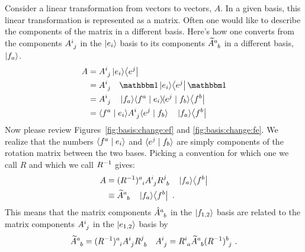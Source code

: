 \documentclass[12pt, oneside]{report}    %
\begin{document}
\begin{subappendices}
Consider a linear transformation from vectors to vectors, $A$. In a given basis, this linear transformation is represented as a matrix. Often one would like to describe the components of the matrix in a different basis. Here's how one converts from the components $A\aij{i}{j}$ in the $\left|e_{i}\right\rangle$ basis to its components $\tilde A\aij{a}{b}$ in a different basis, $\left|f_a\right\rangle$.
\begin{align}
    A &= A\aij{i}{j}\ket{e_i}\!\bra{e^j}
    \\&=
    A\aij{i}{j}\quad
    \one
    \ket{e_i}\!\bra{e^j}
    \one
    \\&=
    A\aij{i}{j}\quad
    \ket{f_a}\!\la {f^a} \mid 
     {e_i} \ra\!  \la {e^j} \mid
    {f_b}\ra \!\bra{f^b}
    \\&=
    \la {f^a} \mid 
     {e_i} \ra
    A\aij{i}{j}
    \la {e^j} \mid
    {f_b}\ra
    \quad
    \ket{f_a}\!\bra{f^b}
\end{align}
Now please review Figures~\ref{fig:basis:change:ef} and \ref{fig:basis:change:fe}. We realize that the numbers $\langle {f^a} \mid 
     {e_i} \rangle$ and $\langle {e^j} \mid
    {f_b}\rangle$ are simply components of the rotation matrix between the two bases. Picking a convention for which one we call $R$ and which we call $R^{-1}$ gives:
\begin{align}
    A &= (R\inv)\aij{a}{i}
    A\aij{i}{j}
    R\aij{j}{b}
    \quad
    \ket{f_a}\!\bra{f^b} 
    \\&\equiv
    \tilde A\aij{a}{b}
    \quad
    \ket{f_a}\!\bra{f^b}
    \ .
\end{align}
This means that the matrix components $\hat A\aij{a}{b}$ in the $\left|f_{1,2}\right\rangle$ basis are related to the matrix components $A\aij{i}{j}$ in the $\left|e_{1,2}\right\rangle$ basis by
\begin{align}
    \tilde A\aij{a}{b} &= (R\inv)\aij{a}{i}
    A\aij{i}{j}
    R\aij{j}{b}
    &
    A\aij{i}{j} = R\aij{i}{a}\tilde A\aij{a}{b}(R\inv)\aij{b}{j} \ .
\end{align}




\end{subappendices}
\end{document}

